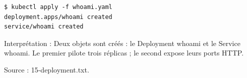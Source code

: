 \documentclass[11pt,a4paper]{article}
\begin{document}
\par\medskip\noindent\begin{minipage}{\linewidth}
\par\vspace{4pt}\noindent\begin{minipage}{\linewidth}
\begin{Verbatim}[breaklines=true,breakanywhere=true,fontsize=\footnotesize,frame=single,framesep=8pt,rulecolor=\color{teal}]
$ kubectl apply -f whoami.yaml
deployment.apps/whoami created
service/whoami created
\end{Verbatim}
\end{minipage}\par\vspace{6pt}

Interprétation : Deux objets sont créés : le Deployment whoami et le Service whoami. Le premier pilote trois réplicas ; le second expose leurs ports HTTP.

{\footnotesize\color{teal} Source : 15-deployment.txt.\par}
\end{minipage}\par\medskip
\end{document}
